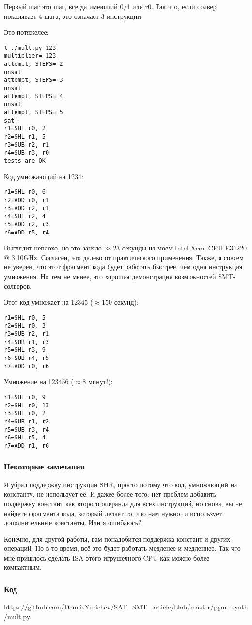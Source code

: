 Первый шаг это шаг, всегда имеющий 0/1 или r0.
Так что, если солвер показывает 4 шага, это означает 3 инструкции.

Это потяжелее:

\begin{lstlisting}
% ./mult.py 123
multiplier= 123
attempt, STEPS= 2
unsat
attempt, STEPS= 3
unsat
attempt, STEPS= 4
unsat
attempt, STEPS= 5
sat!
r1=SHL r0, 2
r2=SHL r1, 5
r3=SUB r2, r1
r4=SUB r3, r0
tests are OK
\end{lstlisting}

Код умножающий на 1234:

\begin{lstlisting}
r1=SHL r0, 6
r2=ADD r0, r1
r3=ADD r2, r1
r4=SHL r2, 4
r5=ADD r2, r3
r6=ADD r5, r4
\end{lstlisting}

Выглядит неплохо, но это заняло $\approx 23$ секунды на моем Intel Xeon CPU E31220 @ 3.10GHz.
Согласен, это далеко от практического применения.
Также, я совсем не уверен, что этот фрагмент кода будет работать быстрее, чем одна инструкция умножения.
Но тем не менее, это хорошая демонстрация возможностей SMT-солверов.

Этот код умножает на 12345 ($\approx 150$ секунд):

\begin{lstlisting}
r1=SHL r0, 5
r2=SHL r0, 3
r3=SUB r2, r1
r4=SUB r1, r3
r5=SHL r3, 9
r6=SUB r4, r5
r7=ADD r0, r6
\end{lstlisting}

Умножение на 123456 ($\approx 8$ минут!):

\begin{lstlisting}
r1=SHL r0, 9
r2=SHL r0, 13
r3=SHL r0, 2
r4=SUB r1, r2
r5=SUB r3, r4
r6=SHL r5, 4
r7=ADD r1, r6
\end{lstlisting}

\subsubsection{Некоторые замечания}

Я убрал поддержку инструкции SHR, просто потому что код, умножающий на константу, не использует её.
И дажее более того: нет проблем добавить поддержку констант как второго операнда для всех инструкций,
но снова, вы не найдете фрагмента кода, который делает то, что нам нужно, и использует дополнительные константы.
Или я ошибаюсь?

Конечно, для другой работы, вам понадобится поддержка констант и других операций.
Но в то время, всё это будет работать медленее и медленнее.
Так что мне пришлось сделать \ac{ISA} этого игрушечного \ac{CPU} как можно более компактным.

\subsubsection{Код}

\url{https://github.com/DennisYurichev/SAT_SMT_article/blob/master/pgm_synth/mult.py}.


